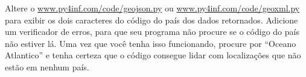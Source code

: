 \begin{ex}
Altere o
\url{www.py4inf.com/code/geojson.py} ou
\url{www.py4inf.com/code/geoxml.py} para exibir os
dois caracteres do código do país dos dados retornados.
Adicione um verificador de erros, para que seu programa
não procure se o código do país não estiver lá. Uma vez
que você tenha isso funcionando, procure por 
``Oceano Atlantico'' e tenha certeza que o código consegue
lidar com localizações que não estão em nenhum país.
\end{ex}

